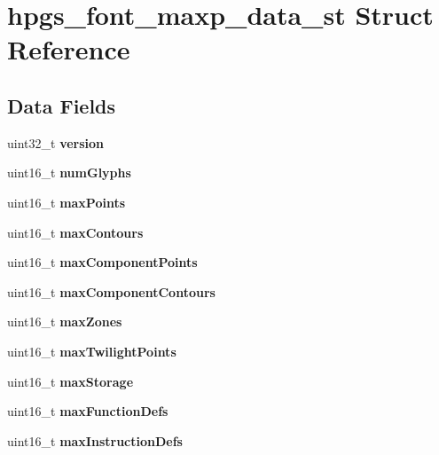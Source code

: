 \section{hpgs\_\-font\_\-maxp\_\-data\_\-st Struct Reference}
\label{structhpgs__font__maxp__data__st}
\subsection*{Data Fields}
\begin{DoxyCompactItemize}
\item 
uint32\_\-t {\bfseries version}\label{structhpgs__font__maxp__data__st_a4706c6fc63df27dc224db7956de724e6}

\item 
uint16\_\-t {\bfseries numGlyphs}\label{structhpgs__font__maxp__data__st_a23a7fb81e77eff9bfa169dc4b59e5c5a}

\item 
uint16\_\-t {\bfseries maxPoints}\label{structhpgs__font__maxp__data__st_abc78a5b6338a79ee02f78ff20f99d05d}

\item 
uint16\_\-t {\bfseries maxContours}\label{structhpgs__font__maxp__data__st_a754c71470f161d2342c59de6d1fa994d}

\item 
uint16\_\-t {\bfseries maxComponentPoints}\label{structhpgs__font__maxp__data__st_ad417b3e0ba27dee7cf282c791812ea6d}

\item 
uint16\_\-t {\bfseries maxComponentContours}\label{structhpgs__font__maxp__data__st_aa732a2deedc06b674ed66424c81a0114}

\item 
uint16\_\-t {\bfseries maxZones}\label{structhpgs__font__maxp__data__st_a80d27fff4aba5db0842fd910045710b0}

\item 
uint16\_\-t {\bfseries maxTwilightPoints}\label{structhpgs__font__maxp__data__st_ae28b698911deb44f89256d5ba972ce70}

\item 
uint16\_\-t {\bfseries maxStorage}\label{structhpgs__font__maxp__data__st_a82d85d9a8030e92357a284cd5c734c99}

\item 
uint16\_\-t {\bfseries maxFunctionDefs}\label{structhpgs__font__maxp__data__st_af60b5c09216f82028cf8b83f389a1c72}

\item 
uint16\_\-t {\bfseries maxInstructionDefs}\label{structhpgs__font__maxp__data__st_a44a13d41c59ebafba576518e2550f460}


\end{DoxyCompactItemize}
